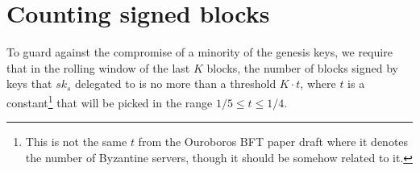 \documentclass[11pt,a4paper]{article}
\newcommand{\type}[1]{\mathsf{#1}}
\begin{document}
\clearpage
\section{Counting signed blocks}

\newcommand{\BSCEnv}{\type{BSCEnv}}
\newcommand{\BSCState}{\type{BSCState}}

To guard against the compromise of a minority of the genesis keys,
we require that in the rolling window of the last $K$ blocks, the number of
blocks signed by keys that $sk_s$ delegated to is no more than a threshold $K
\cdot t$, where $t$ is a constant\footnote{This is not the same $t$ from the
  Ouroboros BFT paper draft where it denotes the number of Byzantine servers,
  though it should be somehow related to it.} that will be picked in the range
$1/5 \leq t \leq 1/4$.
\end{document}
